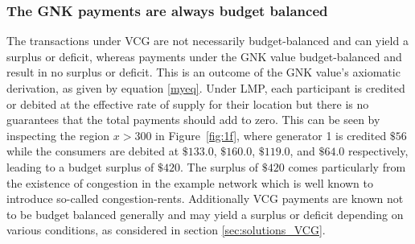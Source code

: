 \subsubsection*{The GNK \DIFaddbegin {}\DIFaddend payments are always budget balanced}
The transactions under \DIFdelbegin {}\DIFdelend VCG are not necessarily budget-balanced and can yield a surplus or deficit, \DIFaddbegin {}\DIFaddend whereas payments under the GNK value \DIFdelbegin {}\DIFdelend \DIFaddbegin {}\DIFaddend budget-balanced and result in no surplus or deficit.
This is an outcome of the GNK value's axiomatic derivation, as given by equation \eqref{myeq}\DIFaddbegin {}\DIFaddend .
Under LMP, each participant is credited or debited at the effective rate of supply for their location but there is no guarantees that the total payments should add to zero.
This can be seen by inspecting the region $x>300$ in Figure~\ref{fig:1f}, where generator 1 is credited $\$56$ while the consumers are debited at $\$133.0$, $\$160.0$, $\$119.0$, and $\$64.0$ respectively, leading to a budget surplus of $\$420$.
The surplus of $\$420$ comes particularly from the existence of congestion in the example network which is well known to introduce so-called \DIFdelbegin {}\DIFdelend \DIFaddbegin {}\DIFaddend congestion-rents\DIFdelbegin {}\DIFdelend \DIFaddbegin {}\DIFaddend .
Additionally VCG payments are known not to be budget balanced generally and may yield a surplus or deficit depending on various conditions, as considered in section \ref{sec:solutions_VCG}.



